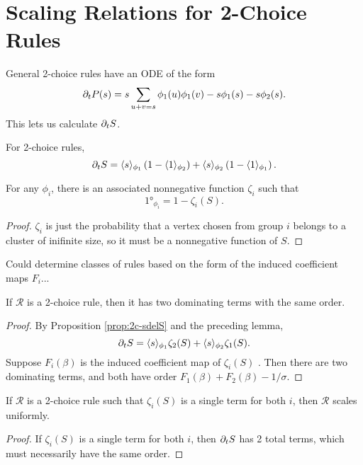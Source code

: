 \documentclass[twoside,10pt]{article}
\begin{document}
\section{Scaling Relations for 2-Choice Rules}

General 2-choice rules have an ODE of the form
	\[
		\partial_{t}{P(s)} = s \sum_{u+v=s} \phi_1(u) \phi_1(v) - s \phi_1(s) - s\phi_2(s).
	\] 
This lets us calculate $\partial_{t}{S} $.
\begin{prop}
	\label{prop:2c-sdelS}
	For 2-choice rules,
	\[
		\partial_{t}{S} = \langle s \rangle_{\phi_1}\left( 1-\langle 1 \rangle_{\phi_2} \right) + \langle s \rangle_{\phi_2}\left( 1-\langle 1 \rangle_{\phi_1} \right).
	\] 
\end{prop}

\begin{lem}[]
For any $\phi_i$, there is an associated nonnegative function $\zeta_i$ such that
\[
	\ang{1}_{\phi_i} = 1 - \zeta_i(S).
\] 
\end{lem}
\begin{proof}
	$\zeta_i$ is just the probability that a vertex chosen from group $i$ belongs to a cluster of inifinite size, so it must be a nonnegative function of $S$. 
\end{proof}



{\color{blue}Could determine classes of rules based on the form of the induced coefficient maps $F_i$...}

\begin{thrm}
	\label{thrm:2-dom-terms}
If $\mathcal{R}$ is a 2-choice rule, then it has two dominating terms with the same order.
\end{thrm}
\begin{proof}
	By Proposition \ref{prop:2c-sdelS} and the preceding lemma,
        \[
	\partial_{t}{S} = \langle s \rangle_{\phi_1}\zeta_{2}(S) + \langle s \rangle_{\phi_2} \zeta_{1}(S).
	\]
	Suppose $F_i(\beta)$ is the induced coefficient map of $\zeta_i(S)$ . Then there are two dominating terms, and both have order $F_1(\beta) + F_2(\beta) - 1/\sigma$.
\end{proof}

\begin{cor}
	If $\mathcal{R}$ is a 2-choice rule such that $\zeta_i(S)$ is a single term for both $i$, then $\mathcal{R}$ scales uniformly.
\end{cor}
\begin{proof}
	If $\zeta_i(S)$ is a single term for both $i$, then $\partial_{t}{S} $ has 2 total terms, which must necessarily have the same order.
\end{proof}
\end{document}
